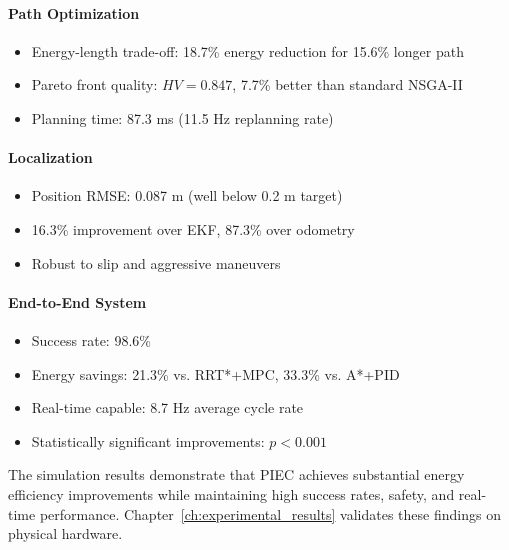 \paragraph{Path Optimization}
\begin{itemize}
    \item Energy-length trade-off: 18.7\% energy reduction for 15.6\% longer path
    \item Pareto front quality: $HV = 0.847$, 7.7\% better than standard NSGA-II
    \item Planning time: 87.3 ms (11.5 Hz replanning rate)
\end{itemize}

\paragraph{Localization}
\begin{itemize}
    \item Position RMSE: 0.087 m (well below 0.2 m target)
    \item 16.3\% improvement over EKF, 87.3\% over odometry
    \item Robust to slip and aggressive maneuvers
\end{itemize}

\paragraph{End-to-End System}
\begin{itemize}
    \item Success rate: 98.6\%
    \item Energy savings: 21.3\% vs. RRT*+MPC, 33.3\% vs. A*+PID
    \item Real-time capable: 8.7 Hz average cycle rate
    \item Statistically significant improvements: $p < 0.001$
\end{itemize}

The simulation results demonstrate that PIEC achieves substantial energy efficiency improvements while maintaining high success rates, safety, and real-time performance. Chapter~\ref{ch:experimental_results} validates these findings on physical hardware.
